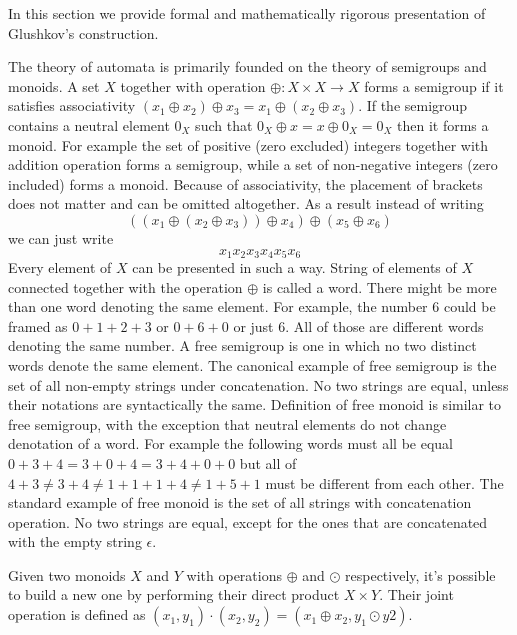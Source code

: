 In this section we provide formal and mathematically rigorous presentation of Glushkov's construction. 

The theory of automata is primarily founded on the theory of semigroups and monoids. A set $X$ together with operation $\oplus:X\times X \rightarrow X$ forms a semigroup if it satisfies associativity $(x_1 \oplus x_2) \oplus x_3= x_1 \oplus (x_2 \oplus x_3)$. If the semigroup contains a neutral element $0_X$ such that $0_X \oplus x = x \oplus 0_X = 0_X$ then it forms a monoid. For example the set of positive (zero excluded) integers together with addition operation forms a semigroup, while a set of non-negative integers (zero included) forms a monoid. Because of associativity, the placement of brackets does not matter and can be omitted  altogether. As a result instead of writing 
\[
((x_1\oplus (x_2 \oplus x_3)) \oplus x_4)\oplus (x_5\oplus x_6)
\]
we can just write 
\[
x_1 x_2  x_3 x_4 x_5 x_6
\]
Every element of $X$ can be presented in such a way.  String of elements of $X$ connected together with the operation $\oplus$ is called a word. There might be more than one word denoting the same element. For example, the number $6$ could be framed as $0+1+2+3$ or $0+6+0$ or just $6$. All of those are different words denoting the same number. A free semigroup is one in which no two distinct words denote the same element. The canonical example of free semigroup is the set of all non-empty strings under concatenation. No two strings are equal, unless their notations are syntactically the same. Definition of free monoid is similar to free semigroup, with the exception that neutral elements do not change denotation of a word. For example the following words must all be equal $0+3+4=3+0+4=3+4+0+0$ but all of $4+3 \ne 3+4 \ne 1+1+1+4 \ne 1 + 5 + 1$ must be different from each other. The standard example of free monoid is the set of all strings with concatenation operation. No two strings are equal, except for the ones that are concatenated with the empty string $\epsilon$. 

Given two monoids $X$ and $Y$ with operations $\oplus$ and $\odot$ respectively, it's possible to build a new one by performing their direct product $X \times Y$. Their joint operation is defined as $(x_1,y_1)\cdot(x_2,y_2) = (x_1 \oplus x_2, y_1 \odot y2)$.



